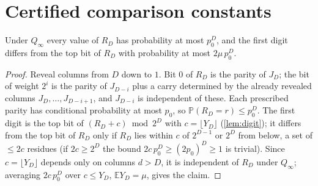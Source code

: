 \documentclass[11pt]{article}
\renewcommand{\Pr}{\mathbb P}
\newcommand{\Ex}{\mathbb E}
\newcommand{\Qinf}{{Q_\infty}}
\begin{document}
\section{Certified comparison constants}\label{sec:constants}

\begin{lemma}\label{lem:trunc}
Under $\Qinf$ every value of $R_D$ has probability at most $p_0^D$, and the first digit differs from the top bit of $R_D$ with probability at most $2\mu\,p_0^D$.
\end{lemma}
\begin{proof}
Reveal columns from $D$ down to $1$. Bit $0$ of $R_D$ is the parity of $J_D$; the bit of weight $2^i$ is the parity of $J_{D-i}$ plus a carry determined by the already revealed columns $J_D,\dots,J_{D-i+1}$, and $J_{D-i}$ is independent of these. Each prescribed parity has conditional probability at most $p_0$, so $\Pr(R_D=r)\le p_0^D$. The first digit is the top bit of $(R_D+c)\bmod 2^D$ with $c=\lfloor Y_D\rfloor$ (\cref{lem:digit}); it differs from the top bit of $R_D$ only if $R_D$ lies within $c$ of $2^{D-1}$ or $2^D$ from below, a set of $\le2c$ residues (if $2c\ge2^D$ the bound $2c\,p_0^D\ge(2p_0)^D\ge1$ is trivial). Since $c=\lfloor Y_D\rfloor$ depends only on columns $d>D$, it is independent of $R_D$ under $\Qinf$; averaging $2c\,p_0^D$ over $c\le Y_D$, $\Ex Y_D=\mu$, gives the claim.
\end{proof}
\end{document}
